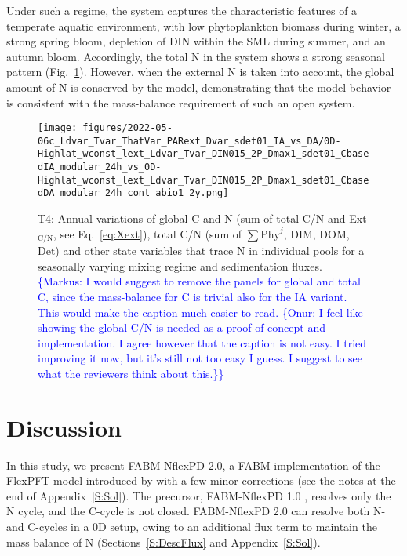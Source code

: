 \documentclass[gmd, manuscript]{copernicus}
\newcommand{\onur}[1]{\textcolor{blue}{\{Onur: #1\}}}
\newcommand{\markus}[1]{\textcolor{blue}{\{Markus: #1\}}}
\begin{document}
Under such a regime, the system captures the characteristic features of a temperate aquatic environment, with low phytoplankton biomass during winter, a strong spring bloom, depletion of DIN within the SML during summer, and an autumn bloom. Accordingly, the total N in the system shows a strong seasonal pattern (Fig.~\ref{f.T4res}). However, when the external N is taken into account, the global amount of N is conserved by the model, demonstrating that the model behavior is consistent with the mass-balance requirement of such an open system.

\begin{figure}[ht!]
\texttt{[image: figures/2022-05-06c\_Ldvar\_Tvar\_ThatVar\_PARext\_Dvar\_sdet01\_IA\_vs\_DA/0D-Highlat\_wconst\_lext\_Ldvar\_Tvar\_DIN015\_2P\_Dmax1\_sdet01\_CbasedIA\_modular\_24h\_vs\_0D-Highlat\_wconst\_lext\_Ldvar\_Tvar\_DIN015\_2P\_Dmax1\_sdet01\_CbasedDA\_modular\_24h\_cont\_abio1\_2y.png]}
\caption{T4: Annual variations of global C and N (sum of total C/N and Ext$_{\text{C/N}}$, see Eq.~\eqref{eq:Xext}), total C/N (sum of $\sum\text{Phy}^j$, DIM, DOM, Det) and other state variables that trace N in individual pools for a seasonally varying mixing regime and sedimentation fluxes. \markus{I would suggest to remove the panels for global and total C, since the mass-balance for C is trivial also for the IA variant.  This would make the caption much easier to read. \onur{I feel like showing the global C/N is needed as a proof of concept and implementation. I agree however that the caption is not easy. I tried improving it now, but it's still not too easy I guess. I suggest to see what the reviewers think about this.}}}\label{f.T4res}
\end{figure}


%

\FloatBarrier%
\section{Discussion}

In this study, we present FABM-NflexPD 2.0, a FABM implementation of the FlexPFT model introduced by \citet{Smith2016} with a few minor corrections (see the notes at the end of Appendix~\ref{S:Sol}). The precursor, FABM-NflexPD 1.0 \citep{Kerimoglu2021}, resolves only the N cycle, and the C-cycle is not closed.  FABM-NflexPD 2.0 can resolve both N- and C-cycles in a 0D setup, owing to an additional flux term to maintain the mass balance of N (Sections~\ref{S:DescFlux} and Appendix~\ref{S:Sol}).
\end{document}
